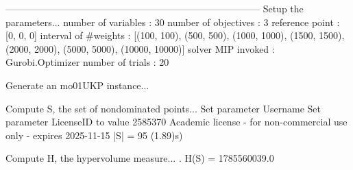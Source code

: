 

--------------------------------------------------------------------------------
Setup the parameters...
  number of variables  : 30
  number of objectives : 3
  reference point      : [0, 0, 0]
  interval of #weights : [(100, 100), (500, 500), (1000, 1000), (1500, 1500), (2000, 2000), (5000, 5000), (10000, 10000)]
  solver MIP invoked   : Gurobi.Optimizer
  number of trials     : 20

Generate an mo01UKP instance...

Compute S, the set of nondominated points...
Set parameter Username
Set parameter LicenseID to value 2585370
Academic license - for non-commercial use only - expires 2025-11-15
  |S|  = 95 (1.89)s)

Compute H, the hypervolume measure...
. H(S) = 1785560039.0

